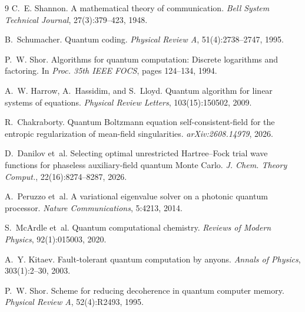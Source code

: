 \documentclass[twocolumn,10pt,letterpaper]{article}
\begin{document}
\begin{thebibliography}{9}
C.~E. Shannon.
\newblock A mathematical theory of communication.
\newblock \textit{Bell System Technical Journal}, 27(3):379--423, 1948.

B.~Schumacher.
\newblock Quantum coding.
\newblock \textit{Physical Review A}, 51(4):2738--2747, 1995.

P.~W. Shor.
\newblock Algorithms for quantum computation: Discrete logarithms and factoring.
\newblock In \textit{Proc. 35th IEEE FOCS}, pages 124--134, 1994.

A.~W. Harrow, A.~Hassidim, and S.~Lloyd.
\newblock Quantum algorithm for linear systems of equations.
\newblock \textit{Physical Review Letters}, 103(15):150502, 2009.

R.~Chakraborty.
\newblock Quantum {B}oltzmann equation self-consistent-field for the entropic regularization of mean-field singularities.
\newblock \textit{arXiv:2608.14979}, 2026.

D.~Danilov et~al.
\newblock Selecting optimal unrestricted {H}artree--{F}ock trial wave functions for phaseless auxiliary-field quantum {M}onte {C}arlo.
\newblock \textit{J. Chem. Theory Comput.}, 22(16):8274--8287, 2026.

A.~Peruzzo et~al.
\newblock A variational eigenvalue solver on a photonic quantum processor.
\newblock \textit{Nature Communications}, 5:4213, 2014.

S.~McArdle et~al.
\newblock Quantum computational chemistry.
\newblock \textit{Reviews of Modern Physics}, 92(1):015003, 2020.

A.~Y. Kitaev.
\newblock Fault-tolerant quantum computation by anyons.
\newblock \textit{Annals of Physics}, 303(1):2--30, 2003.

P.~W. Shor.
\newblock Scheme for reducing decoherence in quantum computer memory.
\newblock \textit{Physical Review A}, 52(4):R2493, 1995.
\end{thebibliography}
\end{document}
